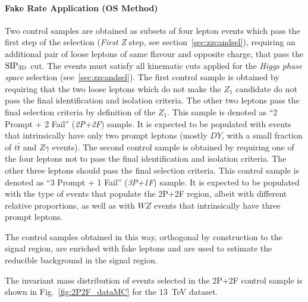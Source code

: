 \paragraph{Fake Rate Application (OS Method)}
\label{sec:zxA}

Two control samples are obtained as subsets of four lepton events
which pass the first step of the selection ({\it First Z} step, see
section~\ref{sec:zzcandsel}), requiring an additional pair of 
loose leptons of same flavour 
and opposite charge, that pass the ${\rm SIP_{3D}}$ cut. 
The events must satisfy all kinematic cuts applied for the {\it Higgs phase space} selection
(see~\ref{sec:zzcandsel}).
The first control sample is obtained by
requiring that the two loose leptons which do not make the $Z_1$ candidate 
do not pass the final identification and
isolation criteria.
The other two leptons pass
the final selection criteria by definition of the $Z_1$. 
This sample is denoted as ``2 Prompt + 2
Fail'' ({\it 2P+2F}) sample. It is expected to be populated with
events that intrinsically have only two prompt leptons 
(mostly $DY$, with a small fraction of $t \bar{t}$ and $Z \gamma$ events).
The second control sample is obtained by requiring one of
the four leptons not to pass the final identification and isolation
criteria.
The other three
leptons should pass the final selection criteria. This control sample
is denoted as ``3 Prompt + 1 Fail'' ({\it 3P+1F}) sample. It is
expected to be populated with the type of events that populate the
2P+2F region, 
albeit with different relative proportions,
as well as with $WZ$ events that intrinsically have three
prompt leptons.


The control samples obtained in this way, orthogonal by construction
to the signal region, are enriched with fake leptons and are used to
estimate the reducible background in the signal
region. 

The invariant mass distribution of events selected in the 2P+2F control sample
is shown in Fig.~\ref{fig:2P2F_dataMC} for the $13$~TeV dataset. 

